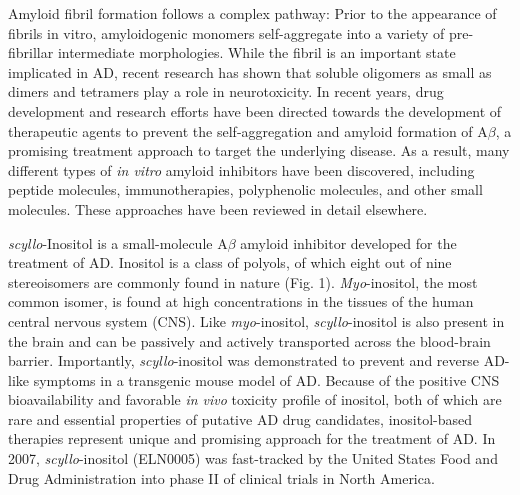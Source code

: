 Amyloid fibril formation follows a complex pathway: Prior to the appearance of fibrils in vitro, amyloidogenic monomers self-aggregate into a variety of pre-fibrillar intermediate morphologies. While the fibril is an important state implicated in AD, recent research has shown that soluble oligomers as small as dimers and tetramers play a role in neurotoxicity.\cite{Bernstein:2009p165} In recent years, drug development and research efforts have been directed towards the development of therapeutic agents to prevent the self-aggregation and amyloid formation of A$\beta$, a promising treatment approach to target the underlying disease.\cite{Masters:2006p183,Citron:2010p214,Dasilva:2010p25} As a result, many different types of \emph{in vitro} amyloid inhibitors have been discovered, including peptide molecules,\cite{EsterasChopo:2008p219,Sciarretta:2006p181,Chalifour:2003p161,Scrocchi:2002p178} immunotherapies,\cite{Janus:2000p198,Solomon:2010p177} polyphenolic molecules,\cite{Masuda:2009p205,Berhanu:2010p230,Ehrnhoefer:2008p8} and other small molecules.\cite{Hawkes:2009p189,Masuda:2009p205,Necula:2007p227,Nitz:2008p13} These approaches have been reviewed in detail elsewhere.\cite{Citron:2010p214,Dasilva:2010p25} 

\emph{scyllo}-Inositol is a small-molecule A$\beta$ amyloid inhibitor developed for the treatment of AD.\cite{Dasilva:2010p25,Hawkes:2009p189,McLaurin:2000p64,Nitz:2008p13,Sun:2008p208} Inositol is a class of polyols, of which eight out of nine stereoisomers are commonly found in nature (Fig. 1). \emph{Myo}-inositol, the most common isomer, is found at high concentrations in the tissues of the human central nervous system (CNS).\cite{Fisher:2002p62} Like \emph{myo}-inositol, \emph{scyllo}-inositol is also present in the brain and can be passively and actively transported across the blood-brain barrier.\cite{Fenili:2007p182} Importantly, \emph{scyllo}-inositol was demonstrated to prevent and reverse AD-like symptoms in a transgenic mouse model of AD.\cite{McLaurin:2006p29} Because of the positive CNS bioavailability and favorable \emph{in vivo} toxicity profile of inositol, both of which are rare and essential properties of putative AD drug candidates, inositol-based therapies represent unique and promising approach for the treatment of AD. In 2007, \emph{scyllo}-inositol (ELN0005) was fast-tracked by the United States Food and Drug Administration into phase II of clinical trials in North America.

